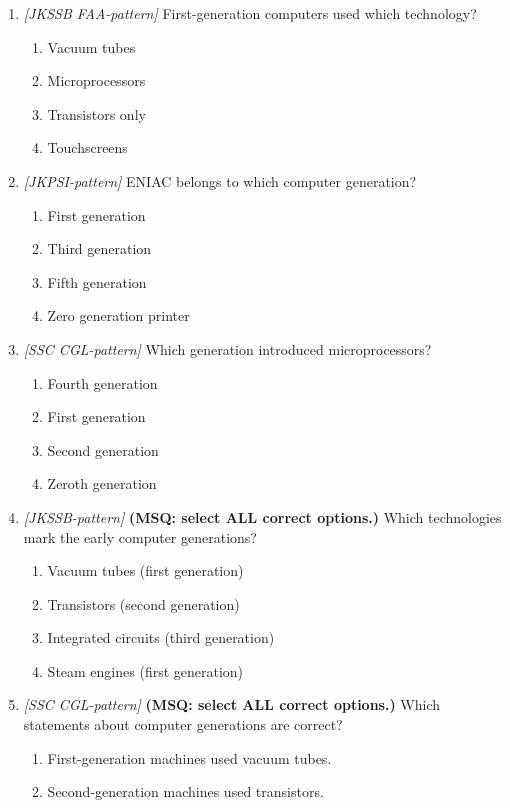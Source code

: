 \begin{enumerate}[label=\textbf{Q\arabic*.}, leftmargin=*]
\item \textit{[JKSSB FAA-pattern]} First-generation computers used which technology?
  \begin{enumerate}[label=\Alph*.]
    \item Vacuum tubes
    \item Microprocessors
    \item Transistors only
    \item Touchscreens
  \end{enumerate}
\item \textit{[JKPSI-pattern]} ENIAC belongs to which computer generation?
  \begin{enumerate}[label=\Alph*.]
    \item First generation
    \item Third generation
    \item Fifth generation
    \item Zero generation printer
  \end{enumerate}
\item \textit{[SSC CGL-pattern]} Which generation introduced microprocessors?
  \begin{enumerate}[label=\Alph*.]
    \item Fourth generation
    \item First generation
    \item Second generation
    \item Zeroth generation
  \end{enumerate}
\item \textit{[JKSSB-pattern]} \textbf{(MSQ: select ALL correct options.)} Which technologies mark the early computer generations?
  \begin{enumerate}[label=\Alph*.]
    \item Vacuum tubes (first generation)
    \item Transistors (second generation)
    \item Integrated circuits (third generation)
    \item Steam engines (first generation)
  \end{enumerate}
\item \textit{[SSC CGL-pattern]} \textbf{(MSQ: select ALL correct options.)} Which statements about computer generations are correct?
  \begin{enumerate}[label=\Alph*.]
    \item First-generation machines used vacuum tubes.
    \item Second-generation machines used transistors.

\end{enumerate}
\end{enumerate}
